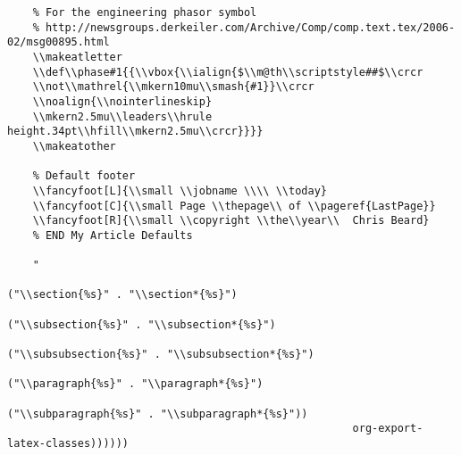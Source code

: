 \documentclass[11pt]{article}
\begin{document}
\begin{verbatim}
    % For the engineering phasor symbol
    % http://newsgroups.derkeiler.com/Archive/Comp/comp.text.tex/2006-02/msg00895.html
    \\makeatletter
    \\def\\phase#1{{\\vbox{\\ialign{$\\m@th\\scriptstyle##$\\crcr
    \\not\\mathrel{\\mkern10mu\\smash{#1}}\\crcr
    \\noalign{\\nointerlineskip}
    \\mkern2.5mu\\leaders\\hrule height.34pt\\hfill\\mkern2.5mu\\crcr}}}}
    \\makeatother
    
    % Default footer
    \\fancyfoot[L]{\\small \\jobname \\\\ \\today}
    \\fancyfoot[C]{\\small Page \\thepage\\ of \\pageref{LastPage}}
    \\fancyfoot[R]{\\small \\copyright \\the\\year\\  Chris Beard}
    % END My Article Defaults
    
    "
                                                        ("\\section{%s}" . "\\section*{%s}")
                                                        ("\\subsection{%s}" . "\\subsection*{%s}")
                                                        ("\\subsubsection{%s}" . "\\subsubsection*{%s}")
                                                        ("\\paragraph{%s}" . "\\paragraph*{%s}")
                                                        ("\\subparagraph{%s}" . "\\subparagraph*{%s}"))
                                                      org-export-latex-classes))))))


\end{verbatim}
\end{document}
